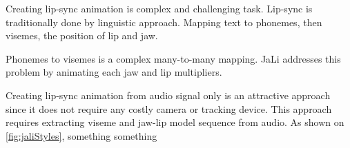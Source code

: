 \documentclass[10pt,twocolumn,letterpaper]{article}
\begin{document}
Creating lip-sync animation is complex and challenging task. Lip-sync is traditionally done by linguistic approach. Mapping text to phonemes, then visemes, the position of lip and jaw\cite{ezzatMikeTalkTalkingFacial1998}.

Phonemes to visemes is a complex many-to-many mapping. JaLi addresses this problem by animating each jaw and lip multipliers.

Creating lip-sync animation from audio signal only is an attractive approach since it does not require any costly camera or tracking device. This approach requires extracting viseme and jaw-lip model sequence from audio.
As shown on \cref{fig:jaliStyles}, something something










{\small



}
\end{document}
